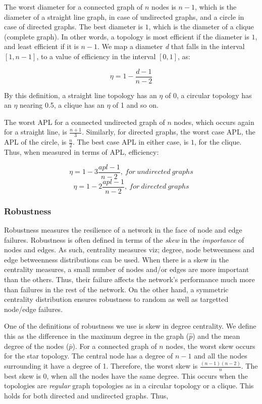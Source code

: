 \documentclass[twocolumn,showpacs,preprintnumbers,amsmath,amssymb]{revtex4}
\begin{document}
The worst diameter for a connected graph of $n$ nodes is $n - 1$, which is the diameter of a straight line graph, in case of undirected graphs, and a circle in case of directed graphs. The best diameter is $1$, which is the diameter of a clique (complete graph). In other words, a topology is most efficient if the diameter is $1$, and least efficient if it is  $n - 1$. We map a diameter \textit{d} that falls in the interval $\left[1, n - 1\right]$, to a value of efficiency in the interval $\left[0, 1\right]$, as:

\[ \eta = 1 - \frac{d - 1} {n - 2} \]

By this definition, a straight line topology has an $\eta$ of 0, a circular topology has an $\eta$ nearing 0.5, a clique has an $\eta$ of 1 and so on.

The worst APL for a connected undirected graph of $n$ nodes, which occurs again for a straight line, is $\frac{n + 1}{3}$. Similarly, for directed graphs, the worst case APL, the APL of the circle, is $\frac{n}{2}$. The best case APL in either case, is $1$, for the clique. Thus, when measured in terms of APL, efficiency:

\[\eta = 1 - 3\frac{apl - 1} {n - 2},\ for\ undirected\ graphs\]
\[\eta = 1 - 2\frac{apl - 1} {n - 2},\ for\ directed\ graphs\]

\subsubsection{Robustness}
Robustness measures the resilience of a network in the face of node and edge failures. Robustness is often defined in terms of the \textit{skew} in the \textit{importance} of nodes and edges. As such, centrality measures viz; degree, node betweenness and edge betweenness distributions can be used. When there is a skew in the centrality measures, a small number of nodes and/or edges are more important than the others. Thus, their failure affects the network's performance much more than failures in the rest of the network. On the other hand, a symmetric centrality distribution ensures robustness to random as well as targetted node/edge failures.

One of the definitions of robustness we use is skew in degree centrality. We define this as the difference in the maximum degree in the graph ($\hat{p}$) and the mean degree of the nodes ($\bar{p}$). For a connected graph of $n$ nodes, the worst skew occurs for the star topology. The central node has a degree of $n - 1$ and all the nodes surrounding it have a degree of 1. Therefore, the worst skew is $\frac{(n - 1)(n - 2)}{n}$. The best skew is 0, when all the nodes have the same degree. This occurs when the topologies are \textit{regular} graph topologies as in a circular topology or a clique. This holds for both directed and undirected graphs. Thus,
\end{document}
